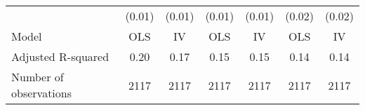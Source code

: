 \begin{tabular}{lllllll}
\multicolumn{1}{l}{} &
  \multicolumn{1}{c}{(0.01)} &
  \multicolumn{1}{c}{(0.01)} &
  \multicolumn{1}{c}{(0.01)} &
  \multicolumn{1}{c}{(0.01)} &
  \multicolumn{1}{c}{(0.02)} &
  \multicolumn{1}{c}{(0.02)} \\
\multicolumn{1}{l}{Model} &
  \multicolumn{1}{c}{OLS} &
  \multicolumn{1}{c}{IV} &
  \multicolumn{1}{c}{OLS} &
  \multicolumn{1}{c}{IV} &
  \multicolumn{1}{c}{OLS} &
  \multicolumn{1}{c}{IV} \\
\multicolumn{1}{l}{Adjusted R-squared} &
  \multicolumn{1}{c}{0.20} &
  \multicolumn{1}{c}{0.17} &
  \multicolumn{1}{c}{0.15} &
  \multicolumn{1}{c}{0.15} &
  \multicolumn{1}{c}{0.14} &
  \multicolumn{1}{c}{0.14} \\
\multicolumn{1}{l}{Number of observations} &
  \multicolumn{1}{c}{2117} &
  \multicolumn{1}{c}{2117} &
  \multicolumn{1}{c}{2117} &
  \multicolumn{1}{c}{2117} &
  \multicolumn{1}{c}{2117} &
  \multicolumn{1}{c}{2117} \\
\cline{1-7}
\end{tabular}
